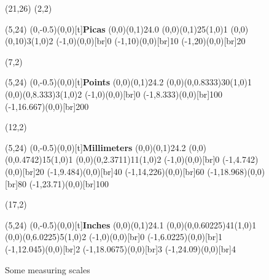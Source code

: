 \begin{lcode}
\begin{figure}
\setlength{\unitlength}{1pc}
\centering
\begin{picture}(21,26)
\put(2,2){\begin{picture}(5,24)
  \put(0,-0.5){\makebox(0,0)[t]{\textbf{Picas}}}
  \thicklines \put(0,0){\line(0,1){24.0}}
  \thinlines \multiput(0,0)(0,1){25}{\line(1,0){1}}
             \multiput(0,0)(0,10){3}{\line(1,0){2}}
  \put(-1,0){\makebox(0,0)[br]{0}}
  \put(-1,10){\makebox(0,0)[br]{10}}
  \put(-1,20){\makebox(0,0)[br]{20}}
  \end{picture}}
\put(7,2){\begin{picture}(5,24)
  \put(0,-0.5){\makebox(0,0)[t]{\textbf{Points}}}
  \thicklines \put(0,0){\line(0,1){24.2}}
  \thinlines \multiput(0,0)(0,0.8333){30}{\line(1,0){1}}
             \multiput(0,0)(0,8.333){3}{\line(1,0){2}}
  \put(-1,0){\makebox(0,0)[br]{0}}
  \put(-1,8.333){\makebox(0,0)[br]{100}}
  \put(-1,16.667){\makebox(0,0)[br]{200}}
  \end{picture}}
\put(12,2){\begin{picture}(5,24)
  \put(0,-0.5){\makebox(0,0)[t]{\textbf{Millimeters}}}
  \thicklines \put(0,0){\line(0,1){24.2}}
  \thinlines \multiput(0,0)(0,0.4742){15}{\line(1,0){1}}
             \multiput(0,0)(0,2.3711){11}{\line(1,0){2}}
  \put(-1,0){\makebox(0,0)[br]{0}}
  \put(-1,4.742){\makebox(0,0)[br]{20}}
  \put(-1,9.484){\makebox(0,0)[br]{40}}
  \put(-1,14,226){\makebox(0,0)[br]{60}}
  \put(-1,18.968){\makebox(0,0)[br]{80}}
  \put(-1,23.71){\makebox(0,0)[br]{100}}
  \end{picture}}
\put(17,2){\begin{picture}(5,24)
  \put(0,-0.5){\makebox(0,0)[t]{\textbf{Inches}}}
  \thicklines \put(0,0){\line(0,1){24.1}}
  \thinlines \multiput(0,0)(0,0.60225){41}{\line(1,0){1}}
             \multiput(0,0)(0,6.0225){5}{\line(1,0){2}}
  \put(-1,0){\makebox(0,0)[br]{0}}
  \put(-1,6.0225){\makebox(0,0)[br]{1}}
  \put(-1,12.045){\makebox(0,0)[br]{2}}
  \put(-1,18.0675){\makebox(0,0)[br]{3}}
  \put(-1,24.09){\makebox(0,0)[br]{4}}
  \end{picture}}

\end{picture}
\setlength{\unitlength}{1pt}
\caption{Some measuring scales} \label{flpic:scales}
\end{figure}
\end{lcode}


